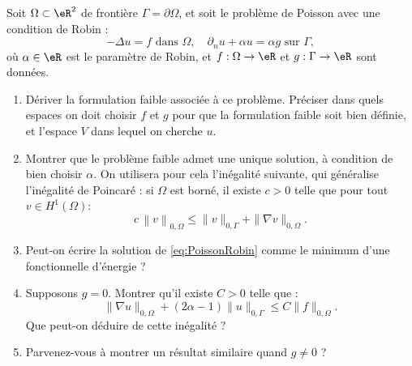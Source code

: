\medskip

\begin{exercice}\label{exoChWeak_Robin}

Soit $\Omega \subset \eR^2$ de frontière $\Gamma = \partial \Omega$, et 
soit le problème de Poisson avec une condition de Robin :
\begin{equation}\label{eq:PoissonRobin}
- \Delta u = f \mbox{ dans } \Omega, \quad \partial_n u + \alpha u = \alpha g \mbox{ sur } \Gamma,
\end{equation}
où $\alpha \in \eR$ est le paramètre de Robin, et $f : \Omega \rightarrow \eR$ et $g : \Gamma \rightarrow \eR$ sont données.

\begin{enumerate}

\item Dériver la formulation faible associée à ce problème. Préciser dans quels espaces on doit choisir $f$ et $g$ pour que la formulation faible soit bien définie, et l'espace $V$ dans lequel on cherche $u$.

\item Montrer que le problème faible admet une unique solution, à condition de bien choisir $\alpha$. On utilisera pour cela l'inégalité suivante, qui généralise l'inégalité de Poincaré : si $\Omega$ est borné, il existe $c>0$ telle que pour tout $v\in H^1(\Omega)$:
\[
c \, \left \| v \right \|_{0,\Omega} \leq \| v \|_{0,\Gamma}+ \| \nabla v \|_{0,\Omega}.
\]

\item Peut-on écrire la solution de \eqref{eq:PoissonRobin} comme le minimum d'une fonctionnelle d'énergie ?

\item Supposons $g=0$. Montrer qu'il existe $C>0$ telle que :
\[
\| \nabla u \|_{0,\Omega} 
+
(2\alpha - 1 ) \| u \|_{0,\Gamma}
\leq C \| f \|_{0,\Omega}.
\]
Que peut-on déduire de cette inégalité ?

\item Parvenez-vous à montrer un résultat similaire quand $g\neq0$ ?

\end{enumerate}

\end{exercice}

\medskip


